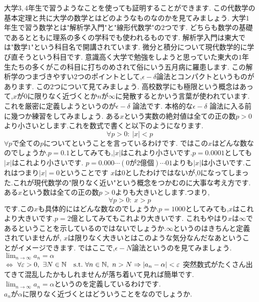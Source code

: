 大学$3,4$年生で習うようなことを使っても証明することができます.
この代数学の基本定理と共に大学の数学とはどのようなものなのかを見てみましょう.
大学$1$年生で習う数学とは"解析学入門"と"線形代数学"の$2$つです.
どちらも数学の基礎であるとともに理系の多くの学科でも使われるものです.
解析学入門は東大では"数学$1$"という科目名で開講されています.
微分と積分について現代数学的に学び直そうという科目です.
意識高く大学で勉強をしようと思っていた東大の$1$年生たちの多くがこの科目に打ちのめされて俗にいう五月病に羅患します.
この解析学のつまづきやすい$2$つのポイントとして,\large{$\epsilon-\delta$論法}と\large{コンパクト}というものがあります.
この$2$つについて見てみましょう.
高校数学にも極限という概念はあって,$x$が$0$に限りなく近づくとか$n$が$\infty$に発散するとかいう言葉が使われています.これを厳密に定義しようというのが$\epsilon - \delta$ 論法です.
本格的な$\epsilon - \delta$ 論法に入る前に幾つか練習をしてみましょう.
\ex
ある$x$という実数の絶対値は全ての正の数$p>0$より小さいとします.これを数式で書くと以下のようになります.
\[
\forall p > 0 : \ |x| < p
\]
$\forall p$で全ての$p$についてということを言っているわけです.
ではこの$x$はどんな数なのでしょうか.$p=0.1$としてみても,$|x|$はこれより小さいです.$p=0.0001$としても$|x|$はこれより小さいです.
$p=0.000\cdots (0が2億個) \cdots 01$よりも$|x|$は小さいです.これはつまり$|x| = 0$ということです
$x$は$0$としたわけではないが,$0$になってしまった.これが現代数学の"限りなく近い"という概念をつかむのに大事な考え方です.
\exx
\ex
ある$x$という数は全ての正の数$p>0$よりも大きいとします.つまり,
\[
\forall p > 0 : \ x > p
\]
です.この$x$も具体的にはどんな数なのでしょうか.$p=1000$としてみても,$x$はこれより大きいです.$p=2億$としてみてもこれより大きいです.
これもやはり$x$は$\infty$であるということを示しているのではないでしょうか.$\infty$というのはきちんと定義されていませんが,
$x$は限りなく大きいとはこのような気分なんだなあということがイメージできます.
\exx
ではここで,$\epsilon-N$論法というのを見てみましょう.
$\lim_{n\to\infty} a_n = \alpha $\\
$\iff$
$\forall \varepsilon > 0,\  \exists N \in \mathbb N \quad \textrm{s.t.}\  \forall n \in \mathbb N,\  n > N \Rightarrow |a_n - \alpha | < \varepsilon $
突然数式がたくさん出てきて混乱したかもしれませんが落ち着いて見れば簡単です.\\
$\lim_{n\to\infty} a_n = \alpha $というのを定義しているわけです.\\
$a_n$が$\alpha$に限りなく近づくとはどういうことをなのでしょうか.\\
